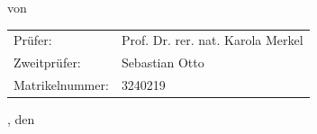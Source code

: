 \begin{titlepage}
\begin{center}
		\textbf{\Large \subjectDocument}

		\vspace*{0.5cm}
		
		{\normalsize von}
		
		\vspace*{0.5cm}
		
		\textbf{\Large \authorDocument}
	
		\vspace*{3.5cm}
		
		\begin{minipage}[t]{13cm}
			\begin{center}
				\begin{tabular}{ll}
					Prüfer: & Prof. Dr. rer. nat. Karola Merkel \\
					Zweitprüfer: & Sebastian Otto \\
					Matrikelnummer: & 3240219 \\
				\end{tabular}
			\end{center}
		\end{minipage}
		
		\vspace*{2.5cm}
	
		{\large \locationDocument, den \dateDocument}
	\end{center}
\end{titlepage}
